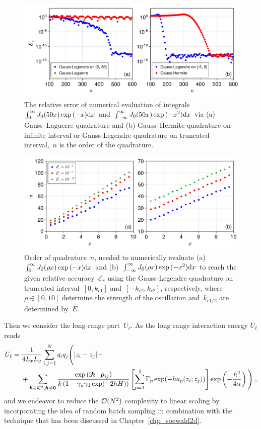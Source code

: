 \begin{figure}[htbp]
    \centering
    \includegraphics[width = \linewidth]{figs/integral_n.pdf}
    \caption{
        The relative error of numerical evaluation of integrals~$\int_0^{\infty} J_0(50 x) \exp{(-x)} \mathrm{d}x$ and~$\int_{-\infty}^{\infty} J_0(50 x) \exp{(-x^2)} \mathrm{d}x$ via (a) Gauss–Laguerre quadrature and (b) Gauss–Hermite quadrature on infinite interval or Gauss-Legendre quadrature on truncated interval,~$n$ is the order of the quadrature.
    }
    \label{fig:Gauss_int}
\end{figure}

\begin{figure}[htbp]
    \centering
    \includegraphics[width = \linewidth]{figs/integral_r.pdf}
    \caption{
    Order of quadrature~$n$, needed to numerically evaluate (a)~$\int_0^{\infty} J_0(\rho x) \exp{(-x)} \mathrm{d}x$ and (b)~$\int_{-\infty}^{\infty} J_0(\rho x) \exp{(-x^2)} \mathrm{d}x$ to reach the given relative accuracy~$\mathcal{E}_r$ using the Gauss-Legendre quadrature on truncated interval~$[0, k_{c1}]$ and~$[-k_{c2}, k_{c2}]$, respectively, where~$\rho \in [0, 10]$ determine the strength of the oscillation and~$k_{c1/2}$ are determined by~$E$.
    }
    \label{fig:Gauss_int_n}
\end{figure}

Then we consider the long-range part~$U_\ell$.
As the long range interaction  energy $U_\ell$ reads
\begin{align*} 
U_\ell&=\frac{1}{4  L_xL_y}\sum_{i,j=1}^N q_iq_j\Bigg({\left\lvert z_i-z_j\right\rvert} +\\&~~~~+  \sum_{\boldsymbol{h}\in\mathcal{K}^2,\boldsymbol{h}\neq\bm{0}} \frac{ \exp{(\mathrm{i} \boldsymbol{h} \cdot \boldsymbol{\rho}_{ij})}}{k\left(1-\gamma_{\mathrm{u}}\gamma_{\mathrm{d}}\exp(-2hH)\right)}\left[\sum_{p=1}^4\Gamma_p\exp(-ha_p(z_i;z_j))\right] \exp\left(-\frac{h^2}{4\alpha}\right)\Bigg)\;,
\end{align*}
and we endeavor to  reduce the $\mathcal{O}(N^2)$ complexity to linear scaling by incorporating the idea of random batch sampling in combination with the technique that has been discussed in Chapter~\ref{chp_soewald2d}.

